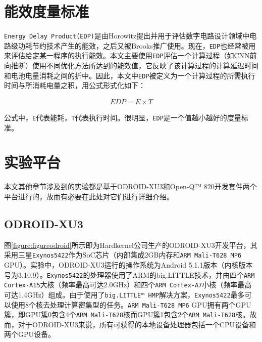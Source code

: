 \section{能效度量标准}
\label{chapter:edp}

\texttt{Energy Delay Product(EDP)}是由Horowitz\cite{horowitz1994low}提出并用于评估数字电路设计领域中电路级功耗节约技术产生的能效，之后又被Brooks\cite{brooks2000power}推广使用。现在，\texttt{EDP}也经常被用来评估给定某一程序的执行能效。本文主要使用\texttt{EDP}评估一个计算过程（如CNN前向推断）使用不同优化方法所达到的能效值，它反映了该计算过程的计算延迟时间和电池电量消耗之间的折中。因此，本文中\texttt{EDP}被定义为一个计算过程的所需执行时间与所消耗电量之积，用公式形式化如下：

\begin{equation}
     \label{equation:equation1}
     \begin{aligned}
        EDP = E \times T
     \end{aligned}
\end{equation}

公式中，\texttt{E}代表能耗，\texttt{T}代表执行时间。很明显，\texttt{EDP}是一个值越小越好的度量标准。

\section{实验平台}

本文其他章节涉及到的实验都是基于ODROID-XU3\cite{hardkernel.com}和Open-Q™ 820开发套件\cite{intrinsyc.com}两个平台进行的，故而有必要在此处对它们进行详细介绍。

\subsection{ODROID-XU3}
\label{chapter:chapter2-5-1}
图\ref{figure:figureodroid}所示即为Hardkernel公司生产的ODROID-XU3开发平台，其采用三星\texttt{Exynos5422}作为SoC芯片（内部集成2GB内存和\texttt{ARM Mali-T628 MP6} GPU）。实验中，ODROID-XU3运行的操作系统为Android 5.1.1版本（内核版本号为3.10.9）。\texttt{Exynos5422}的处理器使用了ARM的big.LITTLE技术，并由四个\texttt{ARM Cortex-A15}大核（频率最高可达2.0GHz）和四个\texttt{ARM Cortex-A7}小核（频率最高可达1.4GHz）组成。由于使用了\texttt{big.LITTLE™ HMP}解决方案，\texttt{Exynos5422}最多可以使用8个核去处理计算密集型的任务。\texttt{ARM Mali-T628 MP6} GPU拥有两个GPU簇，即GPU簇0包含4个\texttt{ARM Mali-T628}核而GPU簇1包含2个\texttt{ARM Mali-T628}核\cite{lokhmotov2015gemmbench}。故而，对于ODROID-XU3来说，所有可获得的本地设备处理器包括一个CPU设备和两个GPU设备\label{chapter:chapter1-1}。

